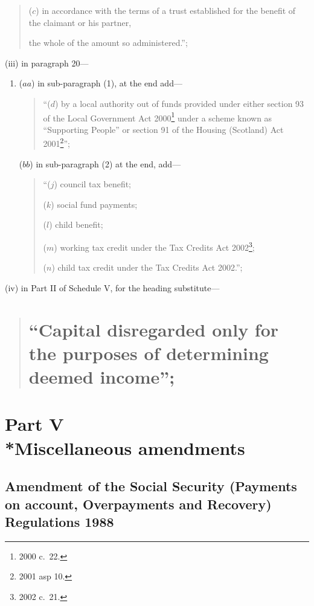 \documentclass[12pt,a4paper]{article}
\begin{document}
\begin{enumerate}
\begin{enumerate}
\begin{quotation}
\begin{enumerate}
($c$) in accordance with the terms of a trust established for the benefit of the claimant or his partner,
\end{enumerate}
the whole of the amount so administered.”;
\end{quotation}

(iii) in paragraph 20—
\begin{enumerate}\item[]
($aa$) in sub-paragraph (1), at the end add—
\begin{quotation}
“($d$) by a local authority out of funds provided under either section 93 of the Local Government Act 2000\footnote{2000 c.\ 22.} under a scheme known as “Supporting People” or section 91 of the Housing (Scotland) Act 2001\footnote{2001 asp 10.}”;
\end{quotation}

($bb$) in sub-paragraph (2) at the end, add—
\begin{quotation}
“($j$) council tax benefit;

($k$) social fund payments;

($l$) child benefit;

($m$) working tax credit under the Tax Credits Act 2002\footnote{2002 c.\ 21.};

($n$) child tax credit under the Tax Credits Act 2002.”;
\end{quotation}
\end{enumerate}

(iv) in Part II of Schedule V, for the heading substitute—
\begin{quotation}
\section*{“Capital disregarded only for the purposes of determining deemed income”;}
\end{quotation}
\end{enumerate}
\end{enumerate}

\section[Part V --- Miscellaneous amendments]{Part V\\*Miscellaneous amendments}

\subsection[24. Amendment of the Social Security (Payments on account, Overpayments and Recovery) Regulations 1988]{\sloppy Amendment of the Social Security (Payments on account, Overpayments and Recovery) Regulations 1988}
\end{document}
